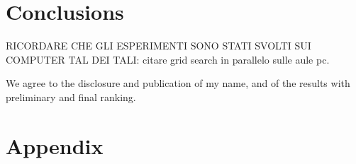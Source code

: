 \section{Conclusions}

RICORDARE CHE GLI ESPERIMENTI SONO STATI SVOLTI SUI COMPUTER TAL DEI TALI: citare grid search in parallelo sulle aule pc.

We agree to the disclosure and publication of my name, and of the results with preliminary and final ranking.

\section{Appendix}


